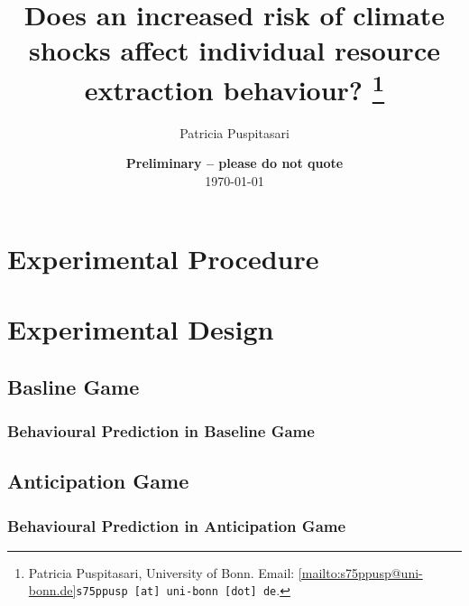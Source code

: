 \documentclass[11pt, a4paper, leqno]{article}
\begin{document}
\title{Does an increased risk of climate shocks affect individual resource extraction behaviour?
\thanks{Patricia Puspitasari, University of Bonn. Email: \ref{mailto:s75ppusp@uni-bonn.de}{\nolinkurl{s75ppusp [at] uni-bonn [dot] de}}.}}

\author{Patricia Puspitasari}

\date{
    {\bf Preliminary -- please do not quote}
    \\[1ex]
    \today
}

\maketitle


\begin{abstract}
    
\end{abstract}

\clearpage


\section{Experimental Procedure}\label{main:section3}


\section{Experimental Design}\label{main:section32}


    \subsection{Basline Game}\label{main:section32a}
    

        \subsubsection{Behavioural Prediction in Baseline Game}\label{main:section32b}
        

    \subsection{Anticipation Game}\label{main:section33a}
    

        \subsubsection{Behavioural Prediction in Anticipation Game}\label{main:section33b}
        
\end{document}
